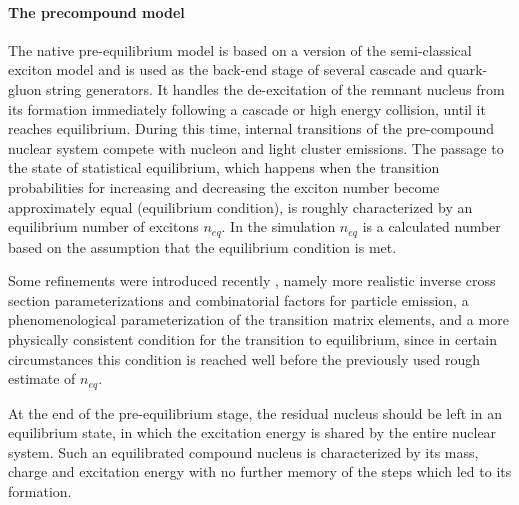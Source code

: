 \paragraph{The precompound model}
The native \Gfour{} pre-equilibrium  model is based on a version of the 
semi-classical exciton model \cite{hadbib:gudima83} and is used as the back-end
stage of several cascade and quark-gluon string generators.  It handles the 
de-excitation of the remnant nucleus from its formation immediately following a
cascade or high energy collision, until it reaches equilibrium.  During this 
time, internal transitions of the pre-compound nuclear system compete with 
nucleon and light cluster emissions.  The passage to the state of statistical 
equilibrium, which happens when the transition probabilities for increasing and 
decreasing the exciton number become approximately equal (equilibrium condition),
is roughly characterized by an equilibrium number of excitons $n_{eq}$.  In the
simulation $n_{eq}$ is a calculated number based on the assumption that the 
equilibrium condition is met. 

Some refinements were introduced recently 
\cite{hadbib:calor-2008, hadbib:ijrb-space-2012, hadbib:iaea-spa-2009}, 
namely more realistic inverse cross section parameterizations and combinatorial
factors for particle emission, a phenomenological parameterization of the 
transition matrix elements, and a more physically consistent condition for the 
transition to equilibrium, since in certain circumstances this condition is 
reached well before the previously used rough estimate of $n_{eq}$.

At the end of the pre-equilibrium stage, the residual nucleus should be left in
an equilibrium state, in which the excitation energy is shared by the entire 
nuclear system.  Such an equilibrated compound nucleus is characterized by its 
mass, charge and excitation energy with no further memory of the steps which led
to its formation.

